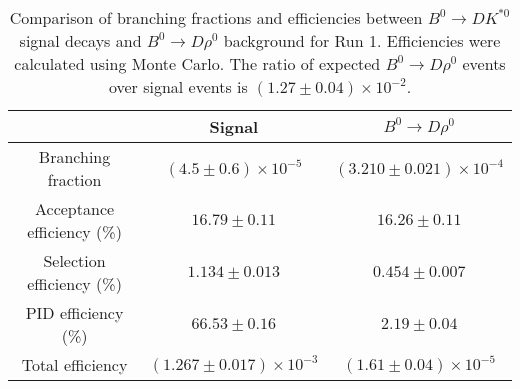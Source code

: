 \begin{table}
    \centering
    \begin{tabular}{ccc}
        \toprule
        & Signal & $B^0 \to D\rho^0$ \\
        \midrule
        Branching fraction & $(4.5 \pm 0.6) \times 10^{-5}$ & $(3.210 \pm 0.021) \times 10^{-4}$ \\
        Acceptance efficiency (\%) & $16.79 \pm 0.11$ & $16.26 \pm 0.11$ \\
        Selection efficiency (\%) & $1.134 \pm 0.013$ & $0.454 \pm 0.007$ \\
        PID efficiency (\%) & $66.53 \pm 0.16$ & $2.19 \pm 0.04$ \\
        \midrule
        Total efficiency & $(1.267 \pm 0.017) \times 10^{-3}$ & $(1.61 \pm 0.04) \times 10^{-5}$ \\
        \bottomrule
        \end{tabular}
        \caption{Comparison of branching fractions and efficiencies between $B^0 \to DK^{*0}$ signal decays and $B^0 \to D\rho^0$ background for Run 1. Efficiencies were calculated using Monte Carlo. The ratio of expected $B^0 \to D\rho^0$ events over signal events is $(1.27 \pm 0.04) \times 10^{-2}$.}
\label{tab:rho_efficiency_run1}
\end{table}
